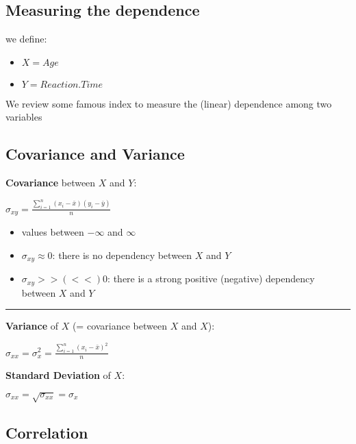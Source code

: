 \documentclass[]{article}
\providecommand{\tightlist}{%
  \setlength{\itemsep}{0pt}\setlength{\parskip}{0pt}}
\begin{document}
\subsection{Measuring the dependence}\label{measuring-the-dependence}

we define:

\begin{itemize}
\tightlist
\item
  \(X=Age\)\\
\item
  \(Y=Reaction.Time\)
\end{itemize}

We review some famous index to measure the (linear) dependence among two
variables

\subsection{Covariance and Variance}\label{covariance-and-variance}

\textbf{Covariance} between \(X\) and \(Y\):

\(\sigma_{xy}=\frac{\sum_{i=1} ^ n (x_i- \bar{x}) (y_i- \bar{y} )}{n}\)

\begin{itemize}
\tightlist
\item
  values between \(- \infty\) and \(\infty\)\\
\item
  \(\sigma_{xy} \approx 0\): there is no dependency between \(X\) and
  \(Y\)\\
\item
  \(\sigma_{xy} >> (<<) 0\): there is a strong positive (negative)
  dependency between \(X\) and \(Y\)
\end{itemize}

\begin{center}\rule{0.5\linewidth}{\linethickness}\end{center}

\textbf{Variance} of \(X\) (= covariance between \(X\) and \(X\)):

\(\sigma_{xx}=\sigma_{x} ^ 2= \frac{\sum_{i=1} ^ n (x_i- \bar{x}) ^ 2}{n}\)

\textbf{Standard Deviation} of \(X\):

\(\sigma_{xx}=\sqrt{\sigma_{xx}}=\sigma_{x}\)

\subsection{Correlation}\label{correlation}
\end{document}
